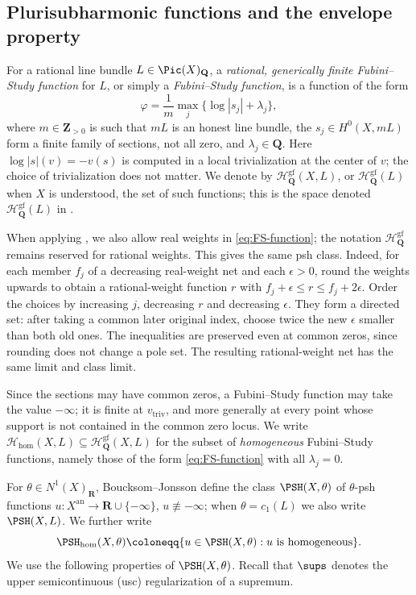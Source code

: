 \documentclass[11pt,a4paper]{article}
\newcommand{\an}{\mathrm{an}}          %
\newcommand{\vtriv}{v_{\mathrm{triv}}} %
\newcommand{\PSHhom}{\PSH_{\mathrm{hom}}}          %
\begin{document}
\subsection{Plurisubharmonic functions and the envelope property}
\label{subsec:prelim-psh}

For a rational line bundle $L\in\Pic(X)_\mathbf{Q}$, a \emph{rational, generically finite Fubini--Study function} for $L$, or simply a \emph{Fubini--Study function}, is a function of the form
\begin{equation}\label{eq:FS-function}
  \varphi=\frac1m\max_j\{\log|s_j|+\lambda_j\},
\end{equation}
where $m\in\mathbf{Z}_{>0}$ is such that $mL$ is an honest line bundle, the $s_j\in H^0(X,mL)$ form a finite family of sections, not all zero, and $\lambda_j\in\mathbf{Q}$.  Here $\log|s|(v)=-v(s)$ is computed in a local trivialization at the center of $v$; the choice of trivialization does not matter.  We denote by $\mathcal{H}^{\mathrm{gf}}_{\mathbf{Q}}(X,L)$, or $\mathcal{H}^{\mathrm{gf}}_{\mathbf{Q}}(L)$ when $X$ is understood, the set of such functions; this is the space denoted $\mathcal H^{\mathrm{gf}}_{\mathbf{Q}}(L)$ in \cite{BJ22,BJaddendum}.

When applying \cite[Definition~4.1]{BJ22}, we also allow real weights in \eqref{eq:FS-function}; the notation $\mathcal H^{\mathrm{gf}}_{\mathbf Q}$ remains reserved for rational weights. This gives the same psh class. Indeed, for each member $f_j$ of a decreasing real-weight net and each $\epsilon>0$, round the weights upwards to obtain a rational-weight function $r$ with $f_j+\epsilon\le r\le f_j+2\epsilon$. Order the choices by increasing $j$, decreasing $r$ and decreasing $\epsilon$. They form a directed set: after taking a common later original index, choose twice the new $\epsilon$ smaller than both old ones. The inequalities are preserved even at common zeros, since rounding does not change a pole set. The resulting rational-weight net has the same limit and class limit.

Since the sections may have common zeros, a Fubini--Study function may take the value $-\infty$; it is finite at $\vtriv$, and more generally at every point whose support is not contained in the common zero locus.  We write $\mathcal{H}_{\mathrm{hom}}(X,L)\subseteq\mathcal{H}^{\mathrm{gf}}_{\mathbf{Q}}(X,L)$ for the subset of \emph{homogeneous} Fubini--Study functions, namely those of the form \eqref{eq:FS-function} with all $\lambda_j=0$.

For $\theta\in N^1(X)_\mathbf{R}$, Boucksom--Jonsson define the class $\PSH(X,\theta)$ of $\theta$-psh functions $u\colon X^{\an}\to\mathbf{R}\cup\{-\infty\}$, $u\not\equiv-\infty$; when $\theta=c_1(L)$ we also write $\PSH(X,L)$.  We further write
\[
  \PSHhom(X,\theta)\coloneqq
  \{u\in\PSH(X,\theta): u\text{ is homogeneous}\}.
\]
We use the following properties of $\PSH(X,\theta)$.  Recall that $\sups$ denotes the upper semicontinuous (usc) regularization of a supremum.
\end{document}
